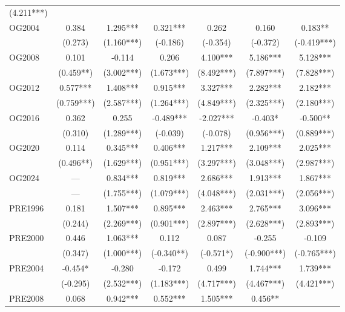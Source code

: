 \begin{table}[H]
{\begin{tabular}{l cccccc}
                (4.211***) \\
OG2004          & 0.384     & 1.295***  & 0.321***  & 0.262     & 0.160 &
0.183**   \\
                & (0.273)   & (1.160***)& (-0.186)  & (-0.354)   & (-0.372) &
                (-0.419***)\\
OG2008          & 0.101     & -0.114    & 0.206     & 4.100***  & 5.186*** &
5.128***  \\
                & (0.459**) & (3.002***)& (1.673***)& (8.492***) & (7.897***) &
                (7.828***) \\
OG2012          & 0.577***  & 1.408***  & 0.915***  & 3.327***  & 2.282*** &
2.182***  \\
                & (0.759***)& (2.587***)& (1.264***)& (4.849***) & (2.325***) &
                (2.180***) \\
OG2016          & 0.362     & 0.255     & -0.489*** & -2.027*** & -0.403* &
-0.500**  \\
                & (0.310)   & (1.289***)& (-0.039)  & (-0.078)   & (0.956***) &
                (0.889***) \\
OG2020          & 0.114     & 0.345***  & 0.406***  & 1.217***  & 2.109*** &
2.025***  \\
                & (0.496**) & (1.629***)& (0.951***)& (3.297***) & (3.048***) &
                (2.987***) \\
OG2024          & ---       & 0.834***  & 0.819***  & 2.686***  & 1.913*** &
1.867***  \\
                & ---       & (1.755***)& (1.079***)& (4.048***) & (2.031***) &
                (2.056***) \\
\midrule
PRE1996         & 0.181     & 1.507***  & 0.895***  & 2.463***  & 2.765*** &
3.096***  \\
                & (0.244)   & (2.269***)& (0.901***)& (2.897***) & (2.628***) &
                (2.893***) \\
PRE2000         & 0.446     & 1.063***  & 0.112     & 0.087     & -0.255 &
-0.109    \\
                & (0.347)   & (1.000***)& (-0.340**)& (-0.571*)  & (-0.900***) &
                (-0.765***)\\
PRE2004         & -0.454*   & -0.280    & -0.172    & 0.499     & 1.744*** &
1.739***  \\
                & (-0.295)  & (2.532***)& (1.183***)& (4.717***) & (4.467***) &
                (4.421***) \\
PRE2008         & 0.068     & 0.942***  & 0.552***  & 1.505***  & 0.456** &

\end{tabular}}
\end{table}
